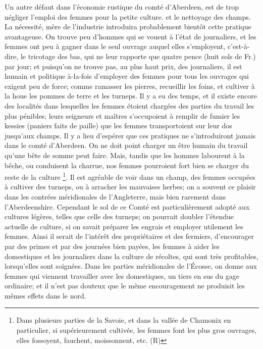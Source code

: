 Un autre défaut dans l'économie rustique du comté d'Aberdeen, est de trop négliger l'emploi des femmes pour la petite culture.\setcounter{page}{344} et le nettoyage des champs. La nécessité, mère de l'industrie introduira probablement bientôt cette pratique avantageuse. On trouve peu d'hommes qui se vouent à l'état de journaliers, et les femmes ont peu à gagner dans le seul ouvrage auquel elles s'employent, c'est-à-dire, le tricotage des bas, qui ne leur rapporte que quatre pence (huit sols de Fr.) par jour; et puisqu'on ne trouve pas, au plus haut prix, des journaliers, il est humain et politique à-la-fois d'employer des femmes pour tous les ouvrages qui exigent peu de force; comme ramasser les pierres, recueillir les foins, et cultiver à la houe les pommes de terre et les turneps. Il y a eu des temps, et il existe encore des localités dans lesquelles les femmes étoient chargées des parties du travail les plus pénibles; leurs seigneurs et maîtres s'occupoient à remplir de fumier les kessies (paniers faits de paille) que les femmes transportoient sur leur dos jusqu'aux champs. Il y a lieu d'espérer que ces pratiques ne s'introduiront jamais dans le comté d'Aberdeen. On ne doit point charger un être humain du travail qu'une bête de somme peut faire. Mais, tandis que les hommes labourent à la bêche, ou conduisent la charrue, nos femmes pourroient fort bien se charger du\setcounter{page}{345} reste de la culture \footnote{Dans plusieurs parties de la Savoie, et dans la vallée de Chamonix en particulier, si supérieurement cultivée, les femmes font les plus gros ouvrages, elles fossoyent, fauchent, moissonnent, etc. (R)}. Il est agréable de voir dans un champ, des femmes occupées à cultiver des turneps, ou à arracher les mauvaises herbes; on a souvent ce plaisir dans les contrées méridionales de l'Angleterre, mais bien rarement dans l'Aberdeenshire. Cependant le sol de ce Comté est particulièrement adopté aux cultures légères, telles que celle des turneps; on pourrait doubler l'étendue actuelle de culture, si on savait préparer les engrais et employer utilement les femmes. Ainsi il serait de l'intérêt des propriétaires et des fermiers, d'encourager par des primes et par des journées bien payées, les femmes à aider les domestiques et les journaliers dans la culture de récoltes, qui sont très profitables, lorsqu'elles sont soignées. Dans les parties méridionales de l'Écosse, on donne aux femmes qui viennent travailler avec les domestiques, un tiers en sus du gage ordinaire; et il n'est pas douteux que le même encouragement ne produisit les mêmes effets dans le nord.
